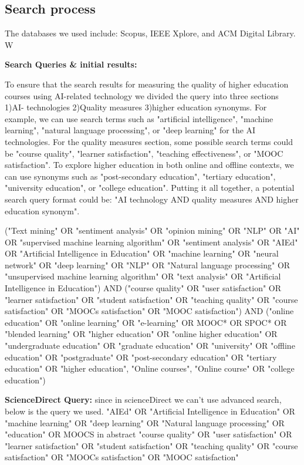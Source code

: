 \documentclass{svproc}
\begin{document}
\subsection{Search process}
\label{searchStrategy}
 The databases we used include: Scopus, IEEE Xplore, and ACM Digital Library. W



\textbf{ Search Queries \& initial results:}

To ensure that the search results for measuring the quality of higher education courses using AI-related technology we divided the query into three sections 1)AI- technologies 2)Quality measures 3)higher education synonyms. For example, we can use search terms such as "artificial intelligence", "machine learning", "natural language processing", or "deep learning" for the AI technologies.
For the quality measures section, some possible search terms could be "course quality", "learner satisfaction", "teaching effectiveness", or "MOOC satisfaction".
To explore higher education in both online and offline contexts, we can use synonyms such as "post-secondary education", "tertiary education", "university education", or "college education".
Putting it all together, a potential search query format could be: "AI technology AND quality measures AND higher education synonym".

("Text mining" OR "sentiment analysis" OR "opinion mining" OR "NLP" OR "AI" OR "supervised machine learning algorithm" OR "sentiment analysis" OR "AIEd" OR "Artificial Intelligence in Education" OR "machine learning" OR "neural network" OR "deep learning" OR "NLP" OR "Natural language processing" OR "unsupervised machine learning algorithm" OR "text analysis" OR "Artificial Intelligence in Education")
AND
("course quality" OR "user satisfaction" OR "learner satisfaction" OR "student satisfaction" OR "teaching quality" OR "course satisfaction" OR "MOOCs satisfaction" OR "MOOC satisfaction")
AND
("online education" OR "online learning" OR "e-learning" OR MOOC* OR SPOC* OR "blended learning" OR "higher education" OR "online higher education" OR "undergraduate education" OR "graduate education" OR "university" OR "offline education" OR "postgraduate" OR "post-secondary education" OR "tertiary education" OR "higher education", "Online courses", "Online course" OR "college education")

\textbf{ScienceDirect Query: } 
since in scienceDirect we can't use advanced search, below is the query we used. 
"AIEd" OR "Artificial Intelligence in Education" OR "machine learning" OR "deep learning" OR "Natural language processing" OR "education" OR MOOCS
in abstract 
"course quality" OR "user satisfaction" OR "learner satisfaction" OR "student satisfaction" OR "teaching quality" OR "course satisfaction" OR "MOOCs satisfaction" OR "MOOC satisfaction"
\end{document}
